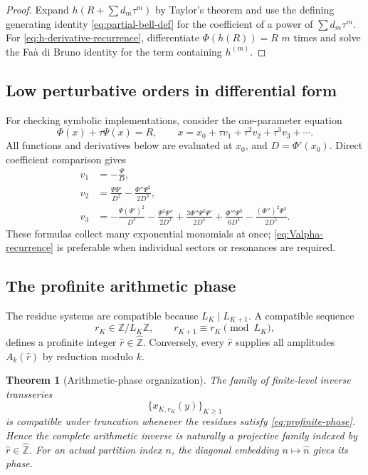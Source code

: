\documentclass[11pt,a4paper]{article}
\numberwithin{equation}{section}
\newtheorem{theorem}{Theorem}[section]
\theoremstyle{remark}
\newcommand{\ZZ}{\mathbb Z}
\begin{document}
\begin{proof}
Expand $h(R+\sum d_m\tau^m)$ by Taylor's theorem and use the defining generating identity \cref{eq:partial-bell-def} for the coefficient of a power of $\sum d_m\tau^m$.  For \cref{eq:h-derivative-recurrence}, differentiate $\Phi(h(R))=R$ $m$ times and solve the Fa\`a di Bruno identity for the term containing $h^{(m)}$.
\end{proof}

\subsection{Low perturbative orders in differential form}

For checking symbolic implementations, consider the one-parameter equation
\begin{equation}\label{eq:tau-equation}
 \Phi(x)+\tau\Psi(x)=R,
 \qquad x=x_0+\tau v_1+\tau^2v_2+\tau^3v_3+\cdots.
\end{equation}
All functions and derivatives below are evaluated at $x_0$, and $D=\Phi'(x_0)$.  Direct coefficient comparison gives
\begin{align}
 v_1&=-\frac{\Psi}{D},\label{eq:v1-diff}\\
 v_2&=\frac{\Psi\Psi'}{D^2}
 -\frac{\Phi''\Psi^2}{2D^3},\label{eq:v2-diff}\\
 v_3&=-\frac{\Psi(\Psi')^2}{D^3}
 -\frac{\Psi^2\Psi''}{2D^3}
 +\frac{3\Phi''\Psi^2\Psi'}{2D^4}
 +\frac{\Phi'''\Psi^3}{6D^4}
 -\frac{(\Phi'')^2\Psi^3}{2D^5}.
 \label{eq:v3-diff}
\end{align}
These formulas collect many exponential monomials at once; \cref{eq:Valpha-recurrence} is preferable when individual sectors or resonances are required.

\subsection{The profinite arithmetic phase}

The residue systems are compatible because $L_K\mid L_{K+1}$.  A compatible sequence
\begin{equation}\label{eq:profinite-phase}
 r_K\in\ZZ/L_K\ZZ,
 \qquad r_{K+1}\equiv r_K\pmod{L_K},
\end{equation}
defines a profinite integer $\widehat r\in\widehat{\ZZ}$.  Conversely, every $\widehat r$ supplies all amplitudes $A_k(\widehat r)$ by reduction modulo $k$.

\begin{theorem}[Arithmetic-phase organization]\label{thm:profinite}
The family of finite-level inverse transseries
\[
 \{x_{K,r_K}(y)\}_{K\ge1}
\]
is compatible under truncation whenever the residues satisfy \cref{eq:profinite-phase}.  Hence the complete arithmetic inverse is naturally a projective family indexed by $\widehat r\in\widehat{\ZZ}$.  For an actual partition index $n$, the diagonal embedding $n\mapsto\widehat n$ gives its phase.
\end{theorem}
\end{document}
